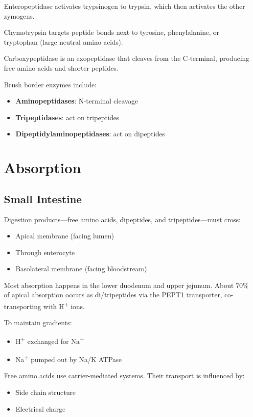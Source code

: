\documentclass{tufte-handout}
\begin{document}
Enteropeptidase activates trypsinogen to trypsin, which then activates the other zymogens.

Chymotrypsin targets peptide bonds next to tyrosine, phenylalanine, or tryptophan (large neutral amino acids).

Carboxypeptidase is an exopeptidase that cleaves from the C-terminal, producing free amino acids and shorter peptides.

Brush border enzymes include:
\begin{itemize}
  \item \textbf{Aminopeptidases}: N-terminal cleavage
  \item \textbf{Tripeptidases}: act on tripeptides
  \item \textbf{Dipeptidylaminopeptidases}: act on dipeptides
\end{itemize}

\section{Absorption}

\subsection{Small Intestine}
Digestion products—free amino acids, dipeptides, and tripeptides—must cross:
\begin{itemize}
  \item Apical membrane (facing lumen)
  \item Through enterocyte
  \item Basolateral membrane (facing bloodstream)
\end{itemize}

Most absorption happens in the lower duodenum and upper jejunum. About 70\% of apical absorption occurs as di/tripeptides via the PEPT1 transporter, co-transporting with H\textsuperscript{+} ions.

To maintain gradients:
\begin{itemize}
  \item H\textsuperscript{+} exchanged for Na\textsuperscript{+}
  \item Na\textsuperscript{+} pumped out by Na/K ATPase
\end{itemize}

Free amino acids use carrier-mediated systems. Their transport is influenced by:
\begin{itemize}
  \item Side chain structure
  \item Electrical charge
\end{itemize}
\end{document}

